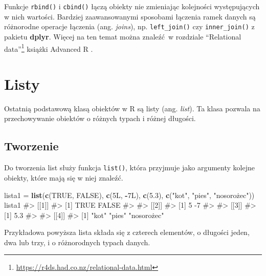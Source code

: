 \documentclass[paper=6in:9in,pagesize=pdftex,headinclude=on,footinclude=on,10pt]{scrbook}
\makeatletter
\newenvironment{Shaded}{\begin{snugshade}}{\end{snugshade}}
\newcommand{\FloatTok}[1]{\textcolor[rgb]{0.00,0.00,0.81}{#1}}
\newcommand{\KeywordTok}[1]{\textcolor[rgb]{0.13,0.29,0.53}{\textbf{#1}}}
\newcommand{\NormalTok}[1]{#1}
\newcommand{\OperatorTok}[1]{\textcolor[rgb]{0.81,0.36,0.00}{\textbf{#1}}}
\newcommand{\OtherTok}[1]{\textcolor[rgb]{0.56,0.35,0.01}{#1}}
\newcommand{\StringTok}[1]{\textcolor[rgb]{0.31,0.60,0.02}{#1}}
\DeclareRobustCommand{\href}[2]{#2\footnote{\url{#1}}}
\newenvironment{kframe}{%
\medskip{}
\setlength{\fboxsep}{.8em}
 \def\at@end@of@kframe{}%
 \ifinner\ifhmode%
  \def\at@end@of@kframe{\end{minipage}}%
  \begin{minipage}{\columnwidth}%
 \fi\fi%
 \def\FrameCommand##1{\hskip\@totalleftmargin \hskip-\fboxsep
 \colorbox{shadecolor}{##1}\hskip-\fboxsep
     \hskip-\linewidth \hskip-\@totalleftmargin \hskip\columnwidth}%
 \MakeFramed {\advance\hsize-\width
   \@totalleftmargin\z@ \linewidth\hsize
   \@setminipage}}%
 {\par\unskip\endMakeFramed%
 \at@end@of@kframe}
\newenvironment{rmdblock}[1]
  {
  \begin{itemize}
  \renewcommand{\labelitemi}{
    \raisebox{-.7\height}[0pt][0pt]{
      {\setkeys{Gin}{width=3em,keepaspectratio}\texttt{[image: images/\#1]}}
    }
  }
  \setlength{\fboxsep}{1em}
  \begin{kframe}
  \item
  }
  {
  \end{kframe}
  \end{itemize}
  }
\newenvironment{rmdinfo}
  {\begin{rmdblock}{compass}}
  {\end{rmdblock}}
\makeatother
\begin{document}
\begin{rmdinfo}
Funkcje \texttt{rbind()} i \texttt{cbind()} łączą obiekty nie zmieniając kolejności występujących w nich wartości.
Bardziej zaawansowanymi sposobami łączenia ramek danych są różnorodne operacje łączenia (ang. \emph{joins}), np. \texttt{left\_join()} czy \texttt{inner\_join()} z pakietu \textbf{dplyr}.
Więcej na ten temat można znaleźć~w rozdziale \href{https://r4ds.had.co.nz/relational-data.html}{``Relational data''} książki Advanced R \citep{wickham2014advanced}.
\end{rmdinfo}

\hypertarget{listy}{%
\section{Listy}\label{listy}}

Ostatnią podstawową klasą obiektów w R są listy (ang. \emph{list}).
Ta klasa pozwala na przechowywanie obiektów o różnych typach i różnej długości.

\hypertarget{tworzenie-2}{%
\subsection{Tworzenie}\label{tworzenie-2}}

Do tworzenia list służy funkcja \texttt{list()}, która przyjmuje jako argumenty kolejne obiekty, które mają się w niej znaleźć.

\begin{Shaded}
\begin{Highlighting}[]
\NormalTok{lista1 =}\StringTok{ }\KeywordTok{list}\NormalTok{(}\KeywordTok{c}\NormalTok{(}\OtherTok{TRUE}\NormalTok{, }\OtherTok{FALSE}\NormalTok{), }
              \KeywordTok{c}\NormalTok{(5L, }\OperatorTok{-}\NormalTok{7L),}
              \KeywordTok{c}\NormalTok{(}\FloatTok{5.3}\NormalTok{), }
              \KeywordTok{c}\NormalTok{(}\StringTok{"kot"}\NormalTok{, }\StringTok{"pies"}\NormalTok{, }\StringTok{"nosorożec"))}
\StringTok{lista1}
\StringTok{#> [[1]]}
\StringTok{#> [1]  TRUE FALSE}
\StringTok{#> }
\StringTok{#> [[2]]}
\StringTok{#> [1]  5 -7}
\StringTok{#> }
\StringTok{#> [[3]]}
\StringTok{#> [1] 5.3}
\StringTok{#> }
\StringTok{#> [[4]]}
\StringTok{#> [1] "}\NormalTok{kot}\StringTok{"       "}\NormalTok{pies}\StringTok{"      "}\NormalTok{nosorożec"}
\end{Highlighting}
\end{Shaded}

Przykładowa powyższa lista składa się z czterech elementów, o długości jeden, dwa lub trzy, i o różnorodnych typach danych.
\end{document}
